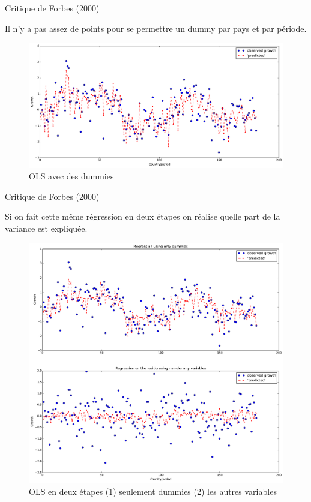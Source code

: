 \documentclass[xcolor=x11names,french]{beamer}
\renewcommand{\(}{\begin{columns}}
\renewcommand{\)}{\end{columns}}
\newcommand{\<}[1]{\begin{column}{#1}}
\renewcommand{\>}{\end{column}}
\begin{document}
\begin{frame}{Critique de Forbes (2000)}


Il n'y a pas assez de points pour se permettre un dummy par pays et par période. 


\begin{figure}
\includegraphics[scale=0.35]{OLS_results}
\caption{OLS avec des dummies}
\end{figure}

\end{frame}


\begin{frame}{Critique de Forbes (2000)}


Si on fait cette même régression en deux étapes on réalise quelle part de la variance est expliquée. 

\begin{figure}
\includegraphics[scale=0.25]{two_steps_OLS}
\caption{OLS en deux étapes (1) seulement dummies (2) les autres variables}
\end{figure}

\end{frame}
\end{document}
